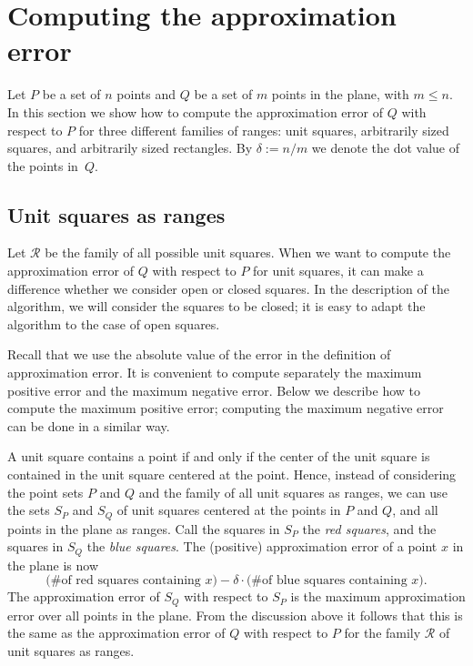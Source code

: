 \documentclass{elsart}
\newcommand{\defsym}{:=}                     %
\newcommand{\ranges}{{\mathcal R}}
\begin{document}
\section{Computing the approximation error}
\label{se:theory}
Let $P$ be a set of $n$ points and $Q$ be a set of $m$ points in the
plane, with $m\leq n$. In this section we show how to compute the
approximation error of $Q$ with respect to $P$ for three different
families of ranges: unit squares, arbitrarily sized squares, and
arbitrarily sized rectangles. By $\delta\defsym n/m$ we denote the dot
value of the points in~$Q$.

\subsection{Unit squares as ranges}
\label{subse:unitsquares}
Let $\ranges$ be the family of all possible unit squares.  When we
want to compute the approximation error of $Q$ with respect to $P$ for
unit squares, it can make a difference whether we consider open or
closed squares. In the description of the algorithm, we will consider
the squares to be closed; it is easy to adapt the algorithm to the
case of open squares.

Recall that we use the absolute value of the error in the definition
of approximation error.  It is convenient to compute separately the
maximum positive error and the maximum negative error. Below we
describe how to compute the maximum positive error; computing the
maximum negative error can be done in a similar way.

A unit square contains a point if and only if the center of the unit
square is contained in the unit square centered at the point. Hence,
instead of considering the point sets $P$ and $Q$ and the family of
all unit squares as ranges, we can use the sets $S_P$ and $S_Q$ of
unit squares centered at the points in $P$ and $Q$, and all points in
the plane as ranges. Call the squares in $S_P$ the \emph{red squares},
and the squares in $S_Q$ the \emph{blue squares}. The (positive)
approximation error of a point $x$ in the plane is now
\[
\mbox{(\# of red squares containing $x$)} -
  \delta \cdot \mbox{(\# of blue squares containing $x$)}.
\]
The approximation error of $S_Q$ with respect to $S_P$ is the maximum
approximation error over all points in the plane. From the
discussion above it follows that this is the same as the approximation
error of $Q$ with respect to $P$ for the family $\ranges$ of unit
squares as ranges.
\end{document}
